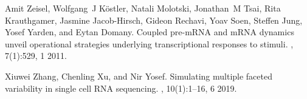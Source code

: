 \documentclass[10pt, a4paper]{article}
\begin{document}
\begin{thebibliography}{10}
	Amit Zeisel, Wolfgang~J K{\"o}stler, Natali Molotski, Jonathan~M Tsai, Rita
	Krauthgamer, Jasmine Jacob-Hirsch, Gideon Rechavi, Yoav Soen, Steffen Jung,
	Yosef Yarden, and Eytan Domany.
	\newblock Coupled pre-{{mRNA}} and {{mRNA}} dynamics unveil operational
	strategies underlying transcriptional responses to stimuli.
	, 7(1):529, 1 2011.
	
	Xiuwei Zhang, Chenling Xu, and Nir Yosef.
	\newblock Simulating multiple faceted variability in single cell {{RNA}}
	sequencing.
	, 10(1):1--16, 6 2019.
	
\end{thebibliography}
\end{document}
